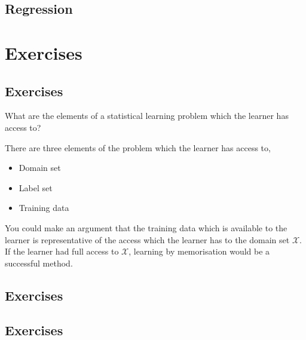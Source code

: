 \subsection{Regression}



\section{Exercises}
\subsection{Exercises \basic}
\begin{exercise}
	\begin{problem}
	What are the elements of a statistical learning problem which the learner has access to?
	\end{problem}
	\begin{solution}
		There are three elements of the problem which the learner has access to,
		\begin{itemize}
			\item Domain set
			\item Label set
			\item Training data
		\end{itemize}

		You could make an argument that the training data which is available to the learner is representative of the access which the learner has to the domain set $ \mathcal{X} $. If the learner had full access to $ \mathcal{X} $, learning by memorisation would be a successful method.
	\end{solution}
\end{exercise}

\subsection{Exercises \intermediate}
\subsection{Exercises \challenging}
